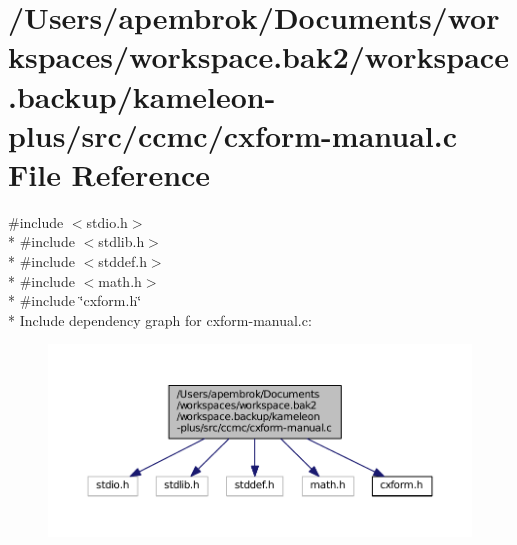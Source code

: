 \hypertarget{cxform-manual_8c}{\section{/\-Users/apembrok/\-Documents/workspaces/workspace.bak2/workspace.backup/kameleon-\/plus/src/ccmc/cxform-\/manual.c File Reference}
\label{cxform-manual_8c}
}
{\ttfamily \#include $<$stdio.\-h$>$}\\*
{\ttfamily \#include $<$stdlib.\-h$>$}\\*
{\ttfamily \#include $<$stddef.\-h$>$}\\*
{\ttfamily \#include $<$math.\-h$>$}\\*
{\ttfamily \#include \char`\"{}cxform.\-h\char`\"{}}\\*
Include dependency graph for cxform-\/manual.c\-:
\nopagebreak
\begin{figure}[H]
\begin{center}
\leavevmode
\includegraphics[width=350pt]{cxform-manual_8c__incl}
\end{center}
\end{figure}
